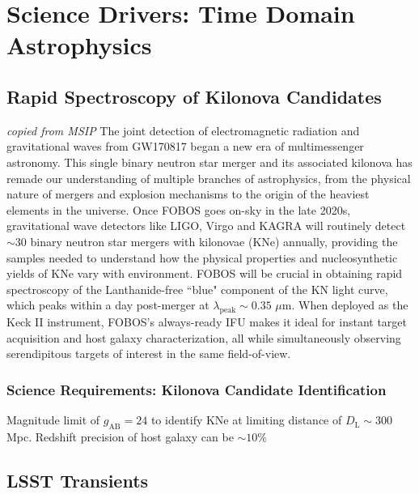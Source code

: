 \documentclass[11pt,a4paper,twoside,onecolumn,openany,final,oldfontcommands]{memoir}
\begin{document}
\chapter{Science Drivers: Time Domain Astrophysics} \label{sci:timedomain}

\section{Rapid Spectroscopy of Kilonova Candidates}

\textit{copied from MSIP}
The joint detection of electromagnetic radiation and gravitational waves from GW170817 began a new era of multimessenger astronomy.  This single binary neutron star merger and its associated kilonova has remade our understanding of multiple branches of astrophysics, from the physical nature of mergers and explosion mechanisms to the origin of the heaviest elements in the universe.  Once FOBOS goes on-sky in the late 2020s, gravitational wave detectors like LIGO, Virgo and KAGRA will routinely detect $\sim$30 binary neutron star mergers with kilonovae (KNe) annually, providing the samples needed to understand how the physical properties and nucleosynthetic yields of KNe vary with environment.  FOBOS will be crucial in obtaining rapid spectroscopy of the Lanthanide-free ``blue" component of the KN light curve, which peaks within a day post-merger at $\lambda_\mathrm{peak}\sim0.35$ $\mu$m. When deployed as the Keck II instrument, FOBOS's always-ready IFU makes it ideal for instant target acquisition and host galaxy characterization, all while simultaneously observing serendipitous targets of interest in the same field-of-view. 


\subsection{Science Requirements: Kilonova Candidate Identification}

\begin{sciencerequirement}

\reqitem Magnitude limit of $g_\mathrm{AB}=24$ to identify KNe at limiting distance of $D_\mathrm{L}\sim300$ Mpc. 
\reqitem Redshift precision of host galaxy can be $\sim10$\%
\end{sciencerequirement}

\section{LSST Transients}
\end{document}
